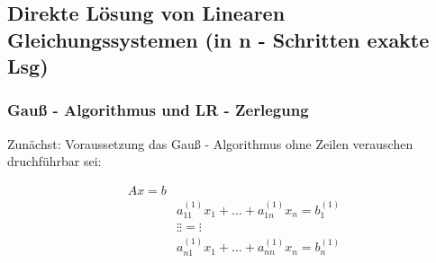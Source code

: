 \subsection{Direkte Lösung von Linearen Gleichungssystemen (in n - Schritten exakte Lsg)}
\subsubsection{Gauß - Algorithmus und LR - Zerlegung}
Zunächst: Voraussetzung das Gauß - Algorithmus ohne Zeilen verauschen druchführbar sei:

\begin{equation*}
  \begin{aligned}
    Ax = b \\
    &a_{11}^{\left(1\right)}x_1 + \ldots + a_{1n}^{\left(1\right)}x_n = b_1^{\left(1\right)}  \\
    &\vdots                               \vdots                     = \vdots  \\
    &a_{n1}^{(1)}x_1 + \ldots + a_{nn}^{(1)}x_n = b_n^{(1)}  \\
  \end{aligned}
\end{equation*}

